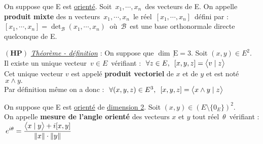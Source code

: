\vspace{1cm}

On suppose que E est \underline{orienté}. Soit \(\,x_1,\cdots,x_n\,\) des vecteurs de E. On appelle \textbf{produit mixte} des n vecteurs \(\,x_1,\cdots,x_n\,\) le réel \(\,[x_1,\cdots,x_n]\,\) défini par :\vspace{0.1cm} \\
\([x_1,\cdots,x_n]=\det_\mathcal{B}(x_1,\cdots,x_n)\ \) où \(\,\mathcal{B}\,\) est une base orthonormale directe quelconque de E.

\vspace{1cm}

\(\left(\mathbf{H}\mathbf{P}\right)\) \underline{\emph{Théorème - définition}} : On suppose que \(\underline{\dim\,\text{E}=3}\). Soit \((x,y)\in E^2\).\vspace{0.1cm}\\
Il existe un unique vecteur \(\,v\in E\,\) vérifiant : \(\;\forall z \in E,\ \, [x,y,z]=\bigl\langle v\mid z \bigr\rangle\)\\
Cet unique vecteur $v$ est appelé \textbf{produit vectoriel} de $x$ et de $y$ et est noté \(\,x\wedge y.\)\vspace{0.1cm}\\
Par définition même on a donc : \(\ \forall(x,y,z)\in E^3,\ \, [x,y,z]=\psm{x\wedge y}{z}\)

\vspace{1.3cm}

On suppose que E est \underline{orienté} de \underline{dimension 2}. Soit \((x,y)\in \left(E\setminus \{0_E\}\right)^2\).\vspace{-0.1cm}\\
On appelle \textbf{mesure de l'angle orienté} des vecteurs $x$ et $y$ tout réel $\,\theta\,$ vérifiant : \(\,\displaystyle e^{i\theta}=\frac{\bigl\langle x\mid y \bigr\rangle+i[x,y]}{\left\lVert x\right\rVert\cdot \left\lVert y\right\rVert}\)

\vspace{1.3cm}

